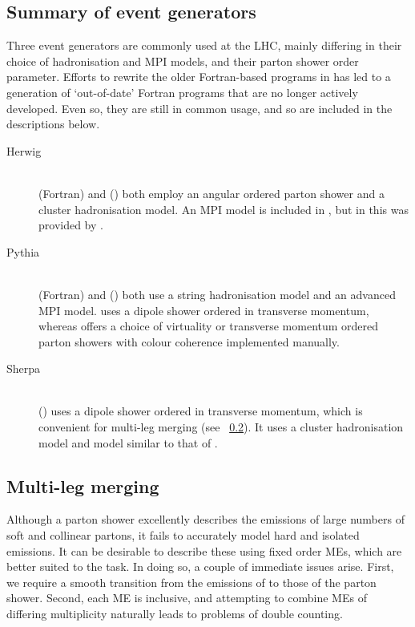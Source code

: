 \subsection{Summary of event generators}
\label{sec:mc:generators}

Three event generators are commonly used at the \acs{LHC}, mainly differing in their 
choice of hadronisation and \ac{MPI} models, and their parton shower order parameter. 
Efforts to rewrite the older Fortran-based programs in \cpp has led to a generation of 
`out-of-date' Fortran programs that are no longer actively developed. Even so, they are 
still in common usage, and so are included in the descriptions below.

\begin{description}
\item[Herwig] \hfill \\
	\fherwig (Fortran) \cite{fHerwig} and \herwigpp (\cpp) \cite{Herwig++} both employ an 
	angular ordered parton shower and a cluster hadronisation model. An \ac{MPI} model is 
	included in \herwigpp, but in \fherwig this was provided by \jimmy \cite{Jimmy}.
\item[Pythia] \hfill \\
	 (Fortran) \cite{Pythia6} and  (\cpp) \cite{Pythia8} both use a 
	string hadronisation model and an advanced \ac{MPI} model.  uses a dipole 
	shower ordered in transverse momentum, whereas  offers a choice of 
	virtuality or transverse momentum ordered parton showers with colour coherence 
	implemented manually.
\item[Sherpa] \hfill \\
	\sherpa (\cpp) \cite{Sherpa} uses a dipole shower ordered in transverse momentum, 
	which is convenient for multi-leg merging (see \Section~\ref{sec:mc:merging}). It 
	uses a cluster hadronisation model and  model similar to that of .
\end{description}



\subsection{Multi-leg merging}
\label{sec:mc:merging}

Although a parton shower excellently describes the emissions of large numbers of soft and 
collinear partons, it fails to accurately model hard and isolated emissions. It can be 
desirable to describe these using fixed order \acp{ME}, which are better suited to the 
task. In doing so, a couple of immediate issues arise. First, we require a smooth 
transition from the emissions of  to those of the parton shower. Second, each 
\ac{ME} is inclusive, and attempting to combine \acp{ME} of differing multiplicity 
naturally leads to problems of double counting.


